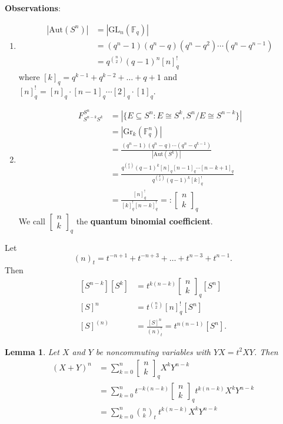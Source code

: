 \documentclass{book}
\newtheorem{lemma}[theorem]{Lemma}
\begin{document}
    \bigskip\noindent
    \textbf{Observations}: 
        \begin{enumerate}
            \item \begin{align*} |\text{Aut}(S^n)|&=|\text{GL}_n(\mathbb{F}_q)|\\
            &=(q^n-1)(q^n-q)(q^n-q^2)\cdots(q^n-q^{n-1})\\
            &= q^{\binom{n}{2}}(q-1)^n[n]^!_q
            \end{align*} where $[k]_q=q^{k-1}+q^{k-2}+\ldots+q+1$ and $[n]_q^! = [n]_q\cdot [n-1]_q\cdots [2]_q\cdot [1]_q$.
            \item \begin{align*} F_{S^{n-k}S^k}^{S^n}&=|\{E\subseteq S^n : E\cong S^k, S^n/E\cong S^{n-k}\}|\\
            &=|\text{Gr}_k(\mathbb{F}_q^n)|\\
            &= \frac{(q^n-1)(q^n-q)\cdots(q^n-q^{k-1})}{|\text{Aut}(S^k)|}\\
            &= \frac{q^{\binom{k}{2}}(q-1)^k[n]_q[n-1]_q \cdots [n-k+1]_q}{q^{\binom{k}{2}} (q-1)^k[k]_q^!}\\
            &= \frac{[n]_q^!}{[k]_q^![n-k]_q^!}=:\begin{bmatrix}n\\ k\end{bmatrix}_q
            \end{align*}
            We call $\begin{bmatrix}n\\ k\end{bmatrix}_q$ the \textbf{quantum binomial coefficient}.
        \end{enumerate}
	
Let \[(n)_t=t^{-n+1}+t^{-n+3}+\ldots+t^{n-3}+t^{n-1}.\] Then 
    \begin{align*}
        \left[S^{n-k}\right]\left[S^k\right]&=t^{k(n-k)}\begin{bmatrix}n\\ k\end{bmatrix}_q\left[S^n\right]\\
        [S]^n &= t^{\binom{n}{2}}[n]_q^!\left[S^n\right]\\
        [S]^{(n)} &= \frac{[S]^n}{(n)_t^!}=t^{n(n-1)}\left[S^n\right].
    \end{align*}
    
     \begin{lemma}
        Let $X$ and $Y$ be noncommuting variables with $YX=t^2XY$. Then \begin{align*}
            (X+Y)^n&=\sum_{k=0}^n \begin{bmatrix}n\\ k\end{bmatrix}_q X^kY^{n-k}\\
            &= \sum_{k=0}^n t^{-k(n-k)}\begin{bmatrix}n\\ k\end{bmatrix}_q t^{k(n-k)}X^kY^{n-k}\\
            &= \sum_{k=0}^n \binom{n}{k}_t \  t^{k(n-k)}X^kY^{n-k}
            \end{align*}
    \end{lemma}
    
\end{document}
